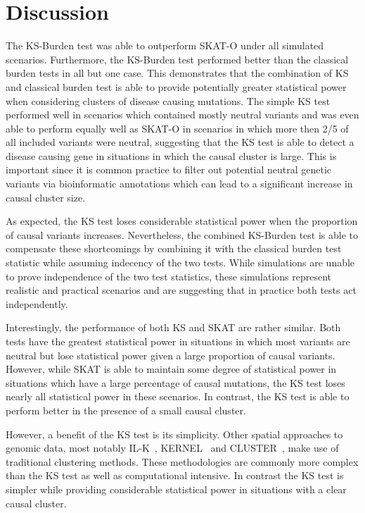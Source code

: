\section{Discussion}
\label{sec:discussion_ks}

The KS-Burden test was able to outperform SKAT-O under all simulated scenarios.
Furthermore, the KS-Burden test performed better than the classical burden tests in all but one case.
This demonstrates that the combination of KS and classical burden test is able to provide potentially greater statistical power when considering clusters of disease causing mutations.
The simple KS test performed well in scenarios which contained mostly neutral variants and was even able to perform equally well as SKAT-O in scenarios in which more then 2/5 of all included variants were neutral, suggesting that the KS test is able to detect a disease causing gene in situations in which the causal cluster is large.
This is important since it is common practice to filter out potential neutral genetic variants via bioinformatic annotations which can lead to a significant increase in causal cluster size.

As expected, the KS test loses considerable statistical power when the proportion of causal variants increases.
Nevertheless, the combined KS-Burden test is able to compensate these shortcomings by combining it with the classical burden test statistic while assuming indecency of the two tests.
While simulations are unable to prove independence of the two test statistics, these simulations represent realistic and practical scenarios and are suggesting that in practice both tests act independently.

Interestingly, the performance of both KS and SKAT are rather similar.
Both tests have the greatest statistical power in situations in which most variants are neutral but lose statistical power given a large proportion of causal variants.
However, while SKAT is able to maintain some degree of statistical power in situations which have a large percentage of causal mutations, the KS test loses nearly all statistical power in these scenarios.
In contrast, the KS test is able to perform better in the presence of a small causal cluster.

However, a benefit of the KS test is its simplicity.
Other spatial approaches to genomic data, most notably IL-K~\cite{Ionita-Laza2012}, KERNEL~\cite{Schaid2013} and CLUSTER~\cite{Lin2014}, make use of traditional clustering methods.
These methodologies are commonly more complex than the KS test as well as computational intensive.
In contrast the KS test is simpler while providing considerable statistical power in situations with a clear causal cluster.

